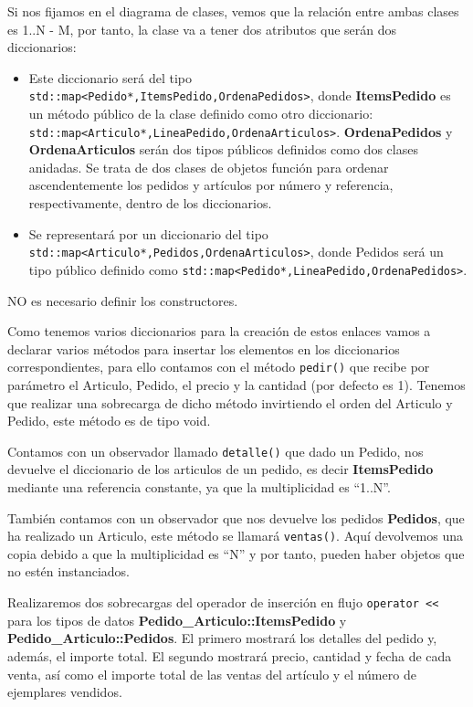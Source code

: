 Si nos fijamos en el diagrama de clases, vemos que la relación entre ambas clases es 1..N - M, por tanto, la clase va a tener dos atributos que serán dos diccionarios:
\begin{itemize}
  \item {} Este diccionario será del tipo\\ \texttt{std::map<Pedido*,ItemsPedido,OrdenaPedidos>}, donde \textbf{ItemsPedido} es un método público de la clase definido como otro diccionario:\\ \texttt{std::map<Articulo*,LineaPedido,OrdenaArticulos>}. \textbf{OrdenaPedidos} y \textbf{OrdenaArticulos} serán dos  tipos públicos definidos como dos clases anidadas. Se trata de dos clases de objetos función para ordenar ascendentemente los pedidos y artículos por número y referencia, respectivamente, dentro de los diccionarios.

  \item {} Se representará por un diccionario del tipo\\ \texttt{std::map<Articulo*,Pedidos,OrdenaArticulos>}, donde Pedidos será un tipo público definido como \texttt{std::map<Pedido*,LineaPedido,OrdenaPedidos>}.
\end{itemize}

NO es necesario definir los constructores.

Como tenemos varios diccionarios para la creación de estos enlaces vamos a declarar varios métodos para insertar los elementos en los diccionarios correspondientes, para ello contamos con el método \texttt{pedir()} que recibe por parámetro el Articulo, Pedido, el precio y la cantidad (por defecto es 1). Tenemos que realizar una sobrecarga de dicho método invirtiendo el orden del Articulo y Pedido, este método es de tipo void.

Contamos con un observador llamado \texttt{detalle()} que dado un Pedido, nos devuelve el diccionario de los articulos de un pedido, es decir \textbf{ItemsPedido} mediante una referencia constante, ya que la multiplicidad es ``1..N''.

También contamos con un observador que nos devuelve los pedidos \textbf{Pedidos}, que ha realizado un Articulo, este método se llamará \texttt{ventas()}. Aquí devolvemos una copia debido a que la multiplicidad es ``N'' y por tanto, pueden haber objetos que no estén instanciados.

Realizaremos dos sobrecargas del operador de inserción en flujo \texttt{operator <<} para los tipos de datos \textbf{Pedido\_Articulo::ItemsPedido} y\\ \textbf{Pedido\_Articulo::Pedidos}. El primero mostrará los detalles del pedido y, además, el importe total. El segundo mostrará precio, cantidad y fecha de cada venta, así como el importe total de las ventas del artículo y el número de ejemplares vendidos.
\newpage
